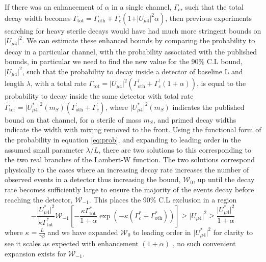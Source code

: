 \documentclass[11pt, a4paper]{article}
\begin{document}
If there was an enhancement of $\alpha$ in a single channel, $\Gamma_c$, such
that the total decay width becomes $\Gamma_\text{tot} =
\Gamma_\text{oth}+\Gamma_c (1+\vert U_{\mu 4}\vert^2 \alpha)$, then previous
experiments searching for heavy sterile decays would have had much more
stringent bounds on $\vert U_{\mu 4} \vert^2$. We can estimate these enhanced
bounds by comparing the probability to decay in a particular channel, with the
probability associated with the published bounds, in particular we need to find
the new value for the 90\% C.L bound, $\vert U_{\mu 4}\vert^2$, such that the
probability to decay inside a detector of baseline L and length $\lambda$, with
a total rate  $\Gamma_\text{tot} = \vert U_{\mu 4}\vert^2
\left(\Gamma_\text{oth}^\prime+\Gamma_c^\prime (1+\alpha)\right)$, is equal to
the probability to decay inside the same detector with total rate
$\tilde{\Gamma}_\text{tot} = \vert U_{\mu 4}^*\vert^2(m_S)
\left(\Gamma_\text{oth}^\prime+\Gamma_c^\prime\right)$, where $\vert U_{\mu
4}^*\vert^2(m_S) $ indicates the published bound on that channel, for a sterile
of mass $m_S$, and primed decay widths indicate the width with mixing removed
to the front. Using the functional form of the probability in equation
\ref{eq:prob}, and expanding to leading order in the assumed small parameter
$\lambda/L$, there are two solutions to this corresponding to the two real
branches of the Lambert-W function. The two solutions correspond physically to
the cases where an increasing decay rate increases the number of observed
events in a detector thus increasing the bound, $\mathcal{W}_0$, up until the
decay rate becomes sufficiently large to ensure the majority of the events
decay before reaching the detector, $\mathcal{W}_{-1}$. This places the 90\%
C.L exclusion in a region \[	-\frac{\vert U_{\mu 4}^* \vert^2}{ \kappa
\Gamma_\text{tot}^{*}} \mathcal{W}_{-1} \left[-\frac{\kappa
\Gamma_\text{tot}^{*}}{1+\alpha} \exp\left(
-\kappa(\Gamma_c^*+\Gamma_\text{oth}^*) \right)     \right]	\geq \vert
U_{\mu 4} \vert^2 \geq \frac{\vert U_{\mu 4}^* \vert^2}{1+\alpha} \] where
$\kappa = \frac{L}{\gamma \beta}$ and we have expanded $\mathcal{W}_0$ to
leading order in $\vert U_{\mu 4}^*\vert^2$ for clarity to see it scales as
expected with enhancement $(1+\alpha)$ , no such convenient expansion exists
for  $\mathcal{W}_{-1}$.  
\end{document}
